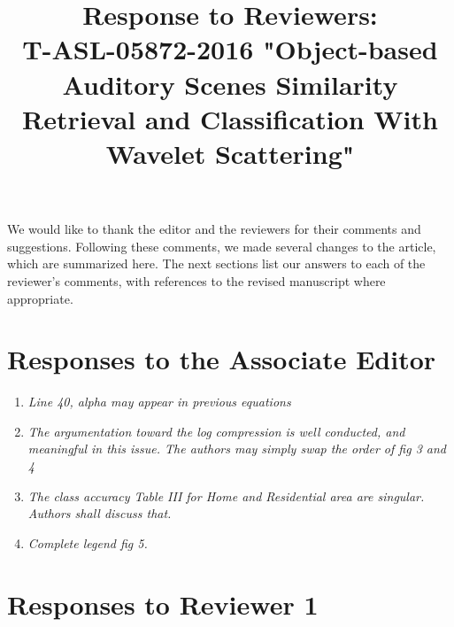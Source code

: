 \documentclass[10pt]{article}
\title{Response to Reviewers: \\ T-ASL-05872-2016 "Object-based Auditory Scenes Similarity Retrieval and Classification With Wavelet Scattering"}
\begin{document}
\maketitle

We would like to thank the editor and the reviewers for their comments and suggestions. Following these comments, we made several changes to the article, which are summarized here. The next sections list our answers to each of the reviewer's comments, with references to the revised manuscript where appropriate.

\section{Responses to the Associate Editor}

\begin{enumerate}

\item \emph{Line 40, alpha may appear in previous equations}

\item \emph{The argumentation toward the log compression is well conducted, and meaningful in this issue. The authors may simply swap the order of fig 3 and 4}

\item \emph{The class accuracy Table III for Home and Residential area are singular. Authors shall discuss that.}

\item \emph{Complete legend fig 5.}

\end{enumerate}

\section{Responses to Reviewer 1}
\end{document}
